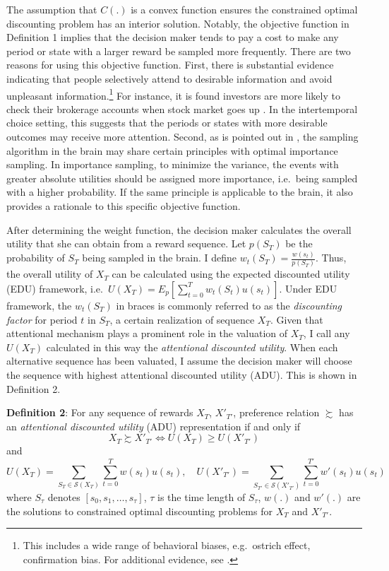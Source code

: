 \documentclass[
  12pt,
]{article}
\begin{document}
The assumption that \(C(.)\) is a convex function ensures the
constrained optimal discounting problem has an interior solution.
Notably, the objective function in Definition 1 implies that the
decision maker tends to pay a cost to make any period or state with a
larger reward be sampled more frequently. There are two reasons for
using this objective function. First, there is substantial evidence
indicating that people selectively attend to desirable information and
avoid unpleasant information.\footnote{This includes a wide range of
  behavioral biases, e.g.~ostrich effect, confirmation bias. For
  additional evidence, see \citet{golman_information_2017}.} For
instance, it is found investors are more likely to check their brokerage
accounts when stock market goes up \citep{sicherman_financial_2016}. In
the intertemporal choice setting, this suggests that the periods or
states with more desirable outcomes may receive more attention. Second,
as is pointed out in \citet{lieder_overrepresentation_2018}, the
sampling algorithm in the brain may share certain principles with
optimal importance sampling. In importance sampling, to minimize the
variance, the events with greater absolute utilities should be assigned
more importance, i.e.~being sampled with a higher probability. If the
same principle is applicable to the brain, it also provides a rationale
to this specific objective function.

After determining the weight function, the decision maker calculates the
overall utility that she can obtain from a reward sequence. Let
\(p(S_T)\) be the probability of \(S_T\) being sampled in the brain. I
define \(w_t(S_T) = \frac{w(s_t)}{p(S_T)}\). Thus, the overall utility
of \(X_T\) can be calculated using the expected discounted utility (EDU)
framework, i.e.~\(U(X_T)=E_p[\sum_{t=0}^Tw_t(S_t)u(s_t)]\). Under EDU
framework, the \(w_t(S_T)\) in braces is commonly referred to as the
\emph{discounting factor} for period \(t\) in \(S_T\), a certain
realization of sequence \(X_T\). Given that attentional mechanism plays
a prominent role in the valuation of \(X_T\), I call any \(U(X_T)\)
calculated in this way the \emph{attentional discounted utility}. When
each alternative sequence has been valuated, I assume the decision maker
will choose the sequence with highest attentional discounted utility
(ADU). This is shown in Definition 2.

\textbf{Definition 2}: For any sequence of rewards \(X_T\), \(X'_{T'}\),
preference relation \(\succsim\) has an \emph{attentional discounted
utility} (ADU) representation if and only if\[
X_T \succsim X'_{T'} \Longleftrightarrow U(X_T)\geq U(X'_{T'})
\]and \[
U(X_T)=\sum_{S_T\in\mathcal{S}(X_T)}\sum_{t=0}^T w(s_t)u(s_t),\quad 
U(X'_{T'})=\sum_{S_{T'}\in\mathcal{S}(X'_{T'})}\sum_{t=0}^{T'} w'(s_t)u(s_t)
\]where \(S_\tau\) denotes \([s_0, s_1,…, s_\tau]\), \(\tau\) is the
time length of \(S_\tau\), \(w(.)\) and \(w'(.)\) are the solutions to
constrained optimal discounting problems for \(X_T\) and \(X'_{T'}\).
\end{document}
